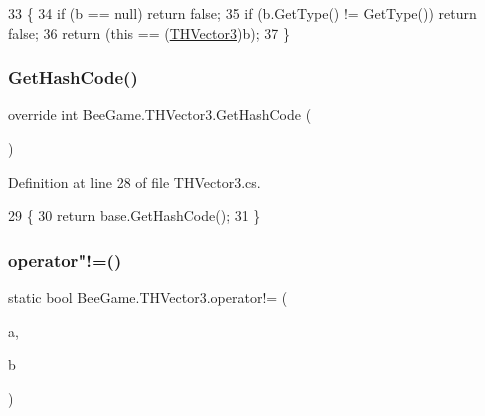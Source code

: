\begin{DoxyCode}
33         \{
34             \textcolor{keywordflow}{if} (b == null) \textcolor{keywordflow}{return} \textcolor{keyword}{false};
35             \textcolor{keywordflow}{if} (b.GetType() != GetType()) \textcolor{keywordflow}{return} \textcolor{keyword}{false};
36             \textcolor{keywordflow}{return} (\textcolor{keyword}{this} == (\hyperlink{struct_bee_game_1_1_t_h_vector3_ad1b3467b019ea95fc114536aab566fb4}{THVector3})b);
37         \}
\end{DoxyCode}
\mbox{\label{struct_bee_game_1_1_t_h_vector3_a4a9942dbfb601a5c857676bc1dd25e43}} 
\subsubsection{\texorpdfstring{Get\+Hash\+Code()}{GetHashCode()}}
{\footnotesize\ttfamily override int Bee\+Game.\+T\+H\+Vector3.\+Get\+Hash\+Code (\begin{DoxyParamCaption}{ }\end{DoxyParamCaption})}



Definition at line 28 of file T\+H\+Vector3.\+cs.


\begin{DoxyCode}
29         \{
30             \textcolor{keywordflow}{return} base.GetHashCode();
31         \}
\end{DoxyCode}
\mbox{\label{struct_bee_game_1_1_t_h_vector3_a899f8d05be6344481d7411fee8b933a1}} 
\subsubsection{\texorpdfstring{operator"!=()}{operator!=()}}
{\footnotesize\ttfamily static bool Bee\+Game.\+T\+H\+Vector3.\+operator!= (\begin{DoxyParamCaption}\item[{\hyperlink{struct_bee_game_1_1_t_h_vector3}{T\+H\+Vector3}}]{a,  }\item[{\hyperlink{struct_bee_game_1_1_t_h_vector3}{T\+H\+Vector3}}]{b }\end{DoxyParamCaption})\hspace{0.3cm}{\ttfamily [static]}}



